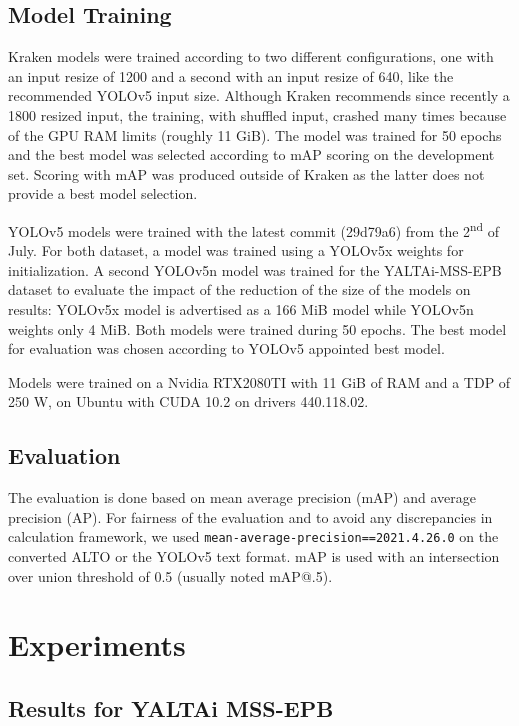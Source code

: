 \documentclass{jdmdh}
\begin{document}
\subsection{Model Training}

Kraken models were trained according to two different configurations, one with an input resize of 1200 and a second with an input resize of 640, like the recommended YOLOv5 input size. Although Kraken recommends since recently a 1800 resized input, the training, with shuffled input, crashed many times because of the GPU RAM limits (roughly 11 GiB). The model was trained for 50 epochs and the best model was selected according to mAP scoring on the development set. Scoring with mAP was produced outside of Kraken as the latter does not provide a best model selection.

YOLOv5 models were trained with the latest commit (29d79a6) from the 2\textsuperscript{nd} of July. For both dataset, a model was trained using a YOLOv5x weights for initialization. A second YOLOv5n model was trained for the YALTAi-MSS-EPB dataset to evaluate the impact of the reduction of the size of the models on results: YOLOv5x model is advertised as a 166 MiB model while YOLOv5n weights only 4 MiB. Both models were trained during 50 epochs. The best model for evaluation was chosen according to YOLOv5 appointed best model.

Models were trained on a Nvidia RTX2080TI with 11 GiB of RAM and a TDP of 250 W, on Ubuntu with CUDA 10.2 on drivers 440.118.02.

\subsection{Evaluation}

The evaluation is done based on mean average precision (mAP) and average precision (AP). For fairness of the evaluation and to avoid any discrepancies in calculation framework, we used \texttt{mean-average-precision==2021.4.26.0} on the converted ALTO or the YOLOv5 text format. mAP is used with an intersection over union threshold of 0.5 (usually noted mAP@.5).

\section{Experiments}

\subsection{Results for YALTAi MSS-EPB}
\end{document}
